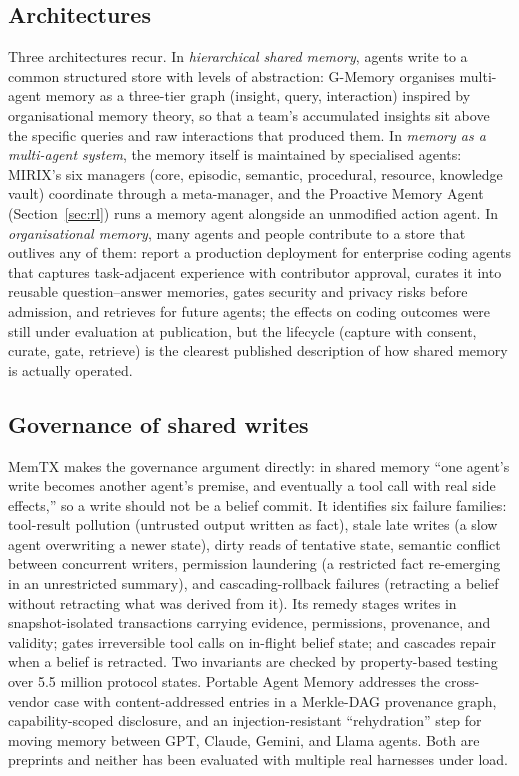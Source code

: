 \documentclass[11pt]{article}
\begin{document}
\subsection{Architectures}

Three architectures recur. In \emph{hierarchical shared memory}, agents write to a common structured store with levels of abstraction: G-Memory \citep{zhang2025gmemory} organises multi-agent memory as a three-tier graph (insight, query, interaction) inspired by organisational memory theory, so that a team's accumulated insights sit above the specific queries and raw interactions that produced them. In \emph{memory as a multi-agent system}, the memory itself is maintained by specialised agents: MIRIX's six managers (core, episodic, semantic, procedural, resource, knowledge vault) coordinate through a meta-manager, and the Proactive Memory Agent (Section~\ref{sec:rl}) runs a memory agent alongside an unmodified action agent. In \emph{organisational memory}, many agents and people contribute to a store that outlives any of them: \citet{dhanyamraju2026orgmemory} report a production deployment for enterprise coding agents that captures task-adjacent experience with contributor approval, curates it into reusable question--answer memories, gates security and privacy risks before admission, and retrieves for future agents; the effects on coding outcomes were still under evaluation at publication, but the lifecycle (capture with consent, curate, gate, retrieve) is the clearest published description of how shared memory is actually operated.

\subsection{Governance of shared writes}

MemTX \citep{li2026memtx} makes the governance argument directly: in shared memory ``one agent's write becomes another agent's premise, and eventually a tool call with real side effects,'' so a write should not be a belief commit. It identifies six failure families: tool-result pollution (untrusted output written as fact), stale late writes (a slow agent overwriting a newer state), dirty reads of tentative state, semantic conflict between concurrent writers, permission laundering (a restricted fact re-emerging in an unrestricted summary), and cascading-rollback failures (retracting a belief without retracting what was derived from it). Its remedy stages writes in snapshot-isolated transactions carrying evidence, permissions, provenance, and validity; gates irreversible tool calls on in-flight belief state; and cascades repair when a belief is retracted. Two invariants are checked by property-based testing over 5.5 million protocol states. Portable Agent Memory \citep{ravindran2026portable} addresses the cross-vendor case with content-addressed entries in a Merkle-DAG provenance graph, capability-scoped disclosure, and an injection-resistant ``rehydration'' step for moving memory between GPT, Claude, Gemini, and Llama agents. Both are preprints and neither has been evaluated with multiple real harnesses under load.
\end{document}
